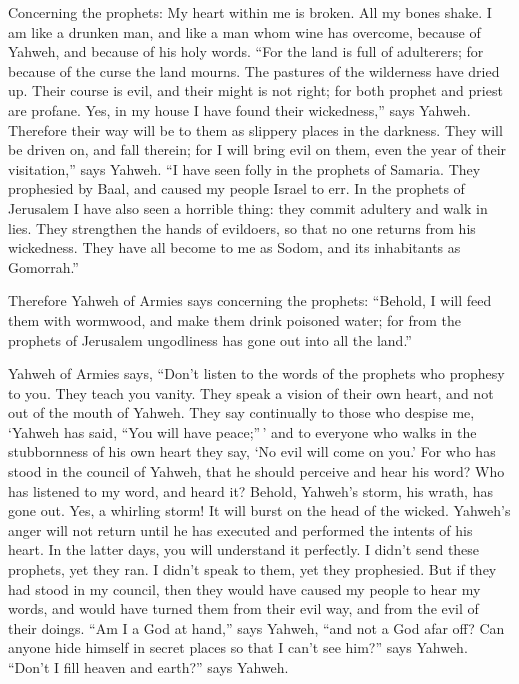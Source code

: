  Concerning the prophets: My heart within me is broken. All
my bones shake. I am like a drunken man, and like a man whom wine has
overcome, because of Yahweh, and because of his holy words.
 ``For the land is full of adulterers; for because of the
curse the land mourns. The pastures of the wilderness have dried up.
Their course is evil, and their might is not right;  for
both prophet and priest are profane. Yes, in my house I have found their
wickedness,'' says Yahweh.  Therefore their way will be to
them as slippery places in the darkness. They will be driven on, and
fall therein; for I will bring evil on them, even the year of their
visitation,'' says Yahweh.  ``I have seen folly in the
prophets of Samaria. They prophesied by Baal, and caused my people
Israel to err.  In the prophets of Jerusalem I have also
seen a horrible thing: they commit adultery and walk in lies. They
strengthen the hands of evildoers, so that no one returns from his
wickedness. They have all become to me as Sodom, and its inhabitants as
Gomorrah.''

 Therefore Yahweh of Armies says concerning the prophets:
``Behold, I will feed them with wormwood, and make them drink poisoned
water; for from the prophets of Jerusalem ungodliness has gone out into
all the land.''

 Yahweh of Armies says, ``Don't listen to the words of the
prophets who prophesy to you. They teach you vanity. They speak a vision
of their own heart, and not out of the mouth of Yahweh. 
They say continually to those who despise me, `Yahweh has said, ``You
will have peace;''\,' and to everyone who walks in the stubbornness of
his own heart they say, `No evil will come on you.'  For
who has stood in the council of Yahweh, that he should perceive and hear
his word? Who has listened to my word, and heard it? 
Behold, Yahweh's storm, his wrath, has gone out. Yes, a whirling storm!
It will burst on the head of the wicked.  Yahweh's anger
will not return until he has executed and performed the intents of his
heart. In the latter days, you will understand it perfectly.
 I didn't send these prophets, yet they ran. I didn't speak
to them, yet they prophesied.  But if they had stood in my
council, then they would have caused my people to hear my words, and
would have turned them from their evil way, and from the evil of their
doings.  ``Am I a God at hand,'' says Yahweh, ``and not a
God afar off?  Can anyone hide himself in secret places so
that I can't see him?'' says Yahweh. ``Don't I fill heaven and earth?''
says Yahweh.

